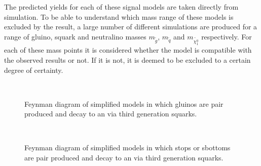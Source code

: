 The predicted yields for each of these signal models are taken
directly from \MC simulation. To be able to understand which mass
range of these models is excluded by the result, a large number of
different simulations are produced for a range of gluino, squark and
neutralino masses $m_{\tilde{g}}$, $m_{\tilde{q}}$ and
$m_{\tilde{\chi^0_1}}$ respectively. For each of these mass points it
is considered whether the model is compatible with the observed
results or not. If it is not, it is deemed to be excluded to a certain
degree of certainty.

\begin{figure}[h!]
  \begin{center}
     ~~
     ~~
    \caption{
      Feynman diagram of simplified models in which gluinos are pair
      produced and decay to an \LSP via third generation squarks. 
    }
    \label{fig:simplified-models-feyn-gluino}
  \end{center}
\end{figure}

\begin{figure}[h!]
  \begin{center}
     ~~
    \caption{
      Feynman diagram of simplified models in which stops or sbottoms are pair
      produced and decay to an \LSP via third generation squarks. 
    }
    \label{fig:simplified-models-feyn-3rdGen}
  \end{center}
\end{figure}

